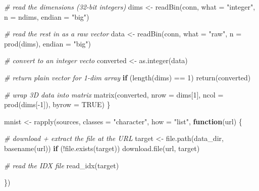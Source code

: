 \documentclass[
]{article}
\newenvironment{Shaded}{\begin{snugshade}}{\end{snugshade}}
\newcommand{\AttributeTok}[1]{\textcolor[rgb]{0.77,0.63,0.00}{#1}}
\newcommand{\CommentTok}[1]{\textcolor[rgb]{0.56,0.35,0.01}{\textit{#1}}}
\newcommand{\ConstantTok}[1]{\textcolor[rgb]{0.00,0.00,0.00}{#1}}
\newcommand{\ControlFlowTok}[1]{\textcolor[rgb]{0.13,0.29,0.53}{\textbf{#1}}}
\newcommand{\DecValTok}[1]{\textcolor[rgb]{0.00,0.00,0.81}{#1}}
\newcommand{\FunctionTok}[1]{\textcolor[rgb]{0.00,0.00,0.00}{#1}}
\newcommand{\NormalTok}[1]{#1}
\newcommand{\OtherTok}[1]{\textcolor[rgb]{0.56,0.35,0.01}{#1}}
\newcommand{\SpecialCharTok}[1]{\textcolor[rgb]{0.00,0.00,0.00}{#1}}
\newcommand{\StringTok}[1]{\textcolor[rgb]{0.31,0.60,0.02}{#1}}
\begin{document}
\begin{Shaded}
\begin{Highlighting}[]
  \CommentTok{\# read the dimensions (32{-}bit integers)}
\NormalTok{  dims }\OtherTok{\textless{}{-}} \FunctionTok{readBin}\NormalTok{(conn, }\AttributeTok{what =} \StringTok{"integer"}\NormalTok{, }\AttributeTok{n =}\NormalTok{ ndims, }\AttributeTok{endian =} \StringTok{"big"}\NormalTok{)}
  
  \CommentTok{\# read the rest in as a raw vector}
\NormalTok{  data }\OtherTok{\textless{}{-}} \FunctionTok{readBin}\NormalTok{(conn, }\AttributeTok{what =} \StringTok{"raw"}\NormalTok{, }\AttributeTok{n =} \FunctionTok{prod}\NormalTok{(dims), }\AttributeTok{endian =} \StringTok{"big"}\NormalTok{)}
  
  \CommentTok{\# convert to an integer vecto}
\NormalTok{  converted }\OtherTok{\textless{}{-}} \FunctionTok{as.integer}\NormalTok{(data)}
  
  \CommentTok{\# return plain vector for 1{-}dim array}
  \ControlFlowTok{if}\NormalTok{ (}\FunctionTok{length}\NormalTok{(dims) }\SpecialCharTok{==} \DecValTok{1}\NormalTok{)}
    \FunctionTok{return}\NormalTok{(converted)}
  
  \CommentTok{\# wrap 3D data into matrix}
  \FunctionTok{matrix}\NormalTok{(converted, }\AttributeTok{nrow =}\NormalTok{ dims[}\DecValTok{1}\NormalTok{], }\AttributeTok{ncol =} \FunctionTok{prod}\NormalTok{(dims[}\SpecialCharTok{{-}}\DecValTok{1}\NormalTok{]), }\AttributeTok{byrow =} \ConstantTok{TRUE}\NormalTok{)}
\NormalTok{\}}

\NormalTok{mnist }\OtherTok{\textless{}{-}} \FunctionTok{rapply}\NormalTok{(sources, }\AttributeTok{classes =} \StringTok{"character"}\NormalTok{, }\AttributeTok{how =} \StringTok{"list"}\NormalTok{, }\ControlFlowTok{function}\NormalTok{(url) \{}
  
  \CommentTok{\# download + extract the file at the URL}
\NormalTok{  target }\OtherTok{\textless{}{-}} \FunctionTok{file.path}\NormalTok{(data\_dir, }\FunctionTok{basename}\NormalTok{(url))}
  \ControlFlowTok{if}\NormalTok{ (}\SpecialCharTok{!}\FunctionTok{file.exists}\NormalTok{(target))}
    \FunctionTok{download.file}\NormalTok{(url, target)}
  
  \CommentTok{\# read the IDX file}
  \FunctionTok{read\_idx}\NormalTok{(target)}
  
\NormalTok{\})}
\end{Highlighting}
\end{Shaded}
\end{document}
